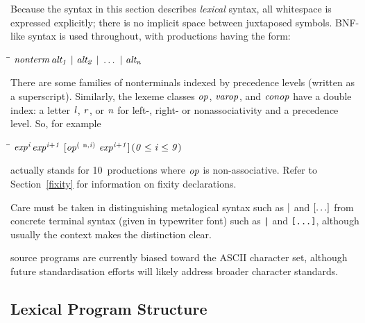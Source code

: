 Because the syntax in this section describes {\em lexical} syntax, all
whitespace is expressed explicitly; there is no
implicit space between juxtaposed symbols.  BNF-like syntax is used
throughout, with productions having the form:
\begin{flushleft}\it\begin{tabbing}
\hspace{0.5in}\=\hspace{3.0in}\=\kill
$\it nonterm$\>\makebox[3.5em]{$\rightarrow$}$\it alt_1\ |\ alt_2\ |\ \ldots \ |\ alt_n$
\end{tabbing}\end{flushleft}

There are some families of nonterminals indexed by
precedence levels (written as a superscript).  Similarly, the
lexeme classes \mbox{$\it op$}, \mbox{$\it varop$}, and \mbox{$\it conop$} have a double index:  a letter \mbox{$\it l$},
\mbox{$\it r$}, or \mbox{$\it n$} for left-, right- or nonassociativity and a precedence
level.  So, for example
\begin{flushleft}\it\begin{tabbing}
\hspace{0.5in}\=\hspace{3.0in}\=\kill
$\it exp^i$\>\makebox[3.5em]{$\rightarrow$}$\it exp^{i+1}\ [op^{({\rm\ n},i)}\ exp^{i+1}]$\>\makebox[3em]{}$\it (0\leq i\leq 9)$
\end{tabbing}\end{flushleft}
actually stands for 10~productions where \mbox{$\it op$} is non-associative.
Refer to Section~\ref{fixity} for information on fixity declarations.

Care must be taken in distinguishing metalogical syntax such as \mbox{$\it |$}
and \mbox{$\it [\ldots ]$} from concrete terminal syntax (given in typewriter font)
such as \mbox{\tt |} and \mbox{\tt [...]}, although usually the context makes the
distinction clear.

\Haskell{} source programs are currently biased toward the ASCII
character set, although future \Haskell{} standardisation efforts will
likely address broader character standards.

\subsection{Lexical Program Structure}
\label{lexemes}
\label{whitespace}

